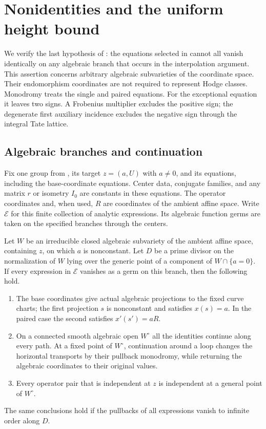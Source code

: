 \section{Nonidentities and the uniform height bound}
\label{nid:section}

We verify the last hypothesis of : the equations selected
in  cannot all vanish identically on any algebraic branch
that occurs in the interpolation argument.  This assertion concerns
arbitrary algebraic subvarieties of the coordinate space.  Their
endomorphism coordinates are not required to represent Hodge classes.
Monodromy treats the single and paired equations.  For the exceptional
equation it leaves two signs.  A Frobenius multiplier excludes the
positive sign; the degenerate first auxiliary incidence excludes the
negative sign through the integral Tate lattice.

\subsection{Algebraic branches and continuation}

Fix one group from , its target $z=(a,U)$ with $a\ne0$,
and its equations, including the base-coordinate equations.  Center data,
conjugate families, and any matrix $r$ or isometry $I_0$ are constants in
these equations.  The operator coordinates and, when used, $R$ are
coordinates of the ambient affine space.  Write $\mathscr E$ for this
finite collection of analytic expressions.  Its algebraic function germs
are taken on the specified branches through the centers.

\begin{lemma}
\label{nid:continuation}
Let $W$ be an irreducible closed algebraic subvariety of the ambient
affine space, containing $z$, on which $a$ is nonconstant.  Let $D$ be a
prime divisor on the normalization of $W$ lying over the generic point
of a component of $W\cap\{a=0\}$.  If every expression in $\mathscr E$
vanishes as a germ on this branch, then the following hold.
\begin{enumerate}[label=\textup{(\roman*)}]
\item The base coordinates give actual algebraic projections to the
fixed curve charts; the first projection $s$ is nonconstant and satisfies
$x(s)=a$.  In the paired case the second satisfies $x'(s')=aR$.
\item On a connected smooth algebraic open $W^\circ$ all the identities
continue along every path.  At a fixed point of $W^\circ$, continuation
around a loop changes the horizontal transports by their pullback
monodromy, while returning the algebraic coordinates to their original
values.
\item Every operator pair that is independent at $z$ is independent at
a general point of $W^\circ$.
\end{enumerate}
The same conclusions hold if the pullbacks of all expressions vanish to
infinite order along $D$.
\end{lemma}

